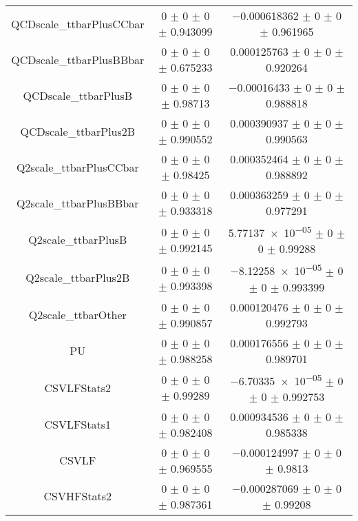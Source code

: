 \begin{table}
\begin{tabular}{ccc}
QCDscale\_ttbarPlusCCbar & \num{0} $\pm$ \num{0} $\pm$ \num{0} $\pm$ \num{0.943099} & \num{-0.000618362} $\pm$ \num{0} $\pm$ \num{0} $\pm$ \num{0.961965}\\
QCDscale\_ttbarPlusBBbar & \num{0} $\pm$ \num{0} $\pm$ \num{0} $\pm$ \num{0.675233} & \num{0.000125763} $\pm$ \num{0} $\pm$ \num{0} $\pm$ \num{0.920264}\\
QCDscale\_ttbarPlusB & \num{0} $\pm$ \num{0} $\pm$ \num{0} $\pm$ \num{0.98713} & \num{-0.00016433} $\pm$ \num{0} $\pm$ \num{0} $\pm$ \num{0.988818}\\
QCDscale\_ttbarPlus2B & \num{0} $\pm$ \num{0} $\pm$ \num{0} $\pm$ \num{0.990552} & \num{0.000390937} $\pm$ \num{0} $\pm$ \num{0} $\pm$ \num{0.990563}\\
Q2scale\_ttbarPlusCCbar & \num{0} $\pm$ \num{0} $\pm$ \num{0} $\pm$ \num{0.98425} & \num{0.000352464} $\pm$ \num{0} $\pm$ \num{0} $\pm$ \num{0.988892}\\
Q2scale\_ttbarPlusBBbar & \num{0} $\pm$ \num{0} $\pm$ \num{0} $\pm$ \num{0.933318} & \num{0.000363259} $\pm$ \num{0} $\pm$ \num{0} $\pm$ \num{0.977291}\\
Q2scale\_ttbarPlusB & \num{0} $\pm$ \num{0} $\pm$ \num{0} $\pm$ \num{0.992145} & \num{5.77137e-05} $\pm$ \num{0} $\pm$ \num{0} $\pm$ \num{0.99288}\\
Q2scale\_ttbarPlus2B & \num{0} $\pm$ \num{0} $\pm$ \num{0} $\pm$ \num{0.993398} & \num{-8.12258e-05} $\pm$ \num{0} $\pm$ \num{0} $\pm$ \num{0.993399}\\
Q2scale\_ttbarOther & \num{0} $\pm$ \num{0} $\pm$ \num{0} $\pm$ \num{0.990857} & \num{0.000120476} $\pm$ \num{0} $\pm$ \num{0} $\pm$ \num{0.992793}\\
PU & \num{0} $\pm$ \num{0} $\pm$ \num{0} $\pm$ \num{0.988258} & \num{0.000176556} $\pm$ \num{0} $\pm$ \num{0} $\pm$ \num{0.989701}\\
CSVLFStats2 & \num{0} $\pm$ \num{0} $\pm$ \num{0} $\pm$ \num{0.99289} & \num{-6.70335e-05} $\pm$ \num{0} $\pm$ \num{0} $\pm$ \num{0.992753}\\
CSVLFStats1 & \num{0} $\pm$ \num{0} $\pm$ \num{0} $\pm$ \num{0.982408} & \num{0.000934536} $\pm$ \num{0} $\pm$ \num{0} $\pm$ \num{0.985338}\\
CSVLF & \num{0} $\pm$ \num{0} $\pm$ \num{0} $\pm$ \num{0.969555} & \num{-0.000124997} $\pm$ \num{0} $\pm$ \num{0} $\pm$ \num{0.9813}\\
CSVHFStats2 & \num{0} $\pm$ \num{0} $\pm$ \num{0} $\pm$ \num{0.987361} & \num{-0.000287069} $\pm$ \num{0} $\pm$ \num{0} $\pm$ \num{0.99208}\\

\end{tabular}
\end{table}
